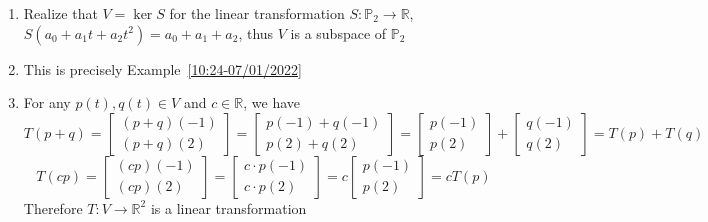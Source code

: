 \documentclass[a4paper,10pt]{article}
\begin{document}
\begin{solution}
\begin{enumerate}[label=\alph*)]
\item Realize that $V=\ker S$ for the linear transformation $S:\mathbb P_2\to\mathbb R$, $S(a_0+a_1t+a_2t^2)=a_0+a_1+a_2$, thus $V$ is a subspace of $\mathbb P_2$
\item This is precisely Example~\ref{10:24-07/01/2022}
\item For any $p(t),q(t)\in V$ and $c\in\mathbb R$, we have
\[
T(p+q)=\begin{bmatrix}
(p+q)(-1)\\(p+q)(2)
\end{bmatrix}=\begin{bmatrix}
p(-1)+q(-1)\\p(2)+q(2)
\end{bmatrix}=\begin{bmatrix}
p(-1)\\p(2)
\end{bmatrix}+\begin{bmatrix}
q(-1)\\q(2)
\end{bmatrix}=T(p)+T(q)
\]
\[
T(cp)=\begin{bmatrix}
(cp)(-1)\\(cp)(2)
\end{bmatrix}=\begin{bmatrix}
c\cdot p(-1)\\c\cdot p(2)
\end{bmatrix}=c\begin{bmatrix}
p(-1)\\p(2)
\end{bmatrix}=cT(p)
\]
Therefore $T:V\to\mathbb R^2$ is a linear transformation
\end{enumerate}
\end{solution}
\end{document}
